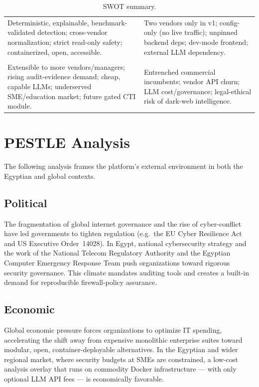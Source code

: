 \begin{table}[ht]
\centering
\caption{SWOT summary.}\label{tab:ch1-swot}
\begin{tabular}{|L{0.46\textwidth}|L{0.46\textwidth}|}
\hline
{} &  \\ \hline
Deterministic, explainable, benchmark-validated detection; cross-vendor normalization; strict read-only safety; containerized, open, accessible. &
Two vendors only in v1; config-only (no live traffic); unpinned backend deps; dev-mode frontend; external LLM dependency. \\ \hline
{} &  \\ \hline
Extensible to more vendors/managers; rising audit-evidence demand; cheap, capable LLMs; underserved SME/education market; future gated CTI module. &
Entrenched commercial incumbents; vendor API churn; LLM cost/governance; legal-ethical risk of dark-web intelligence. \\ \hline
\end{tabular}
\end{table}

\section{PESTLE Analysis}
\label{sec:ch1-pestle}

The following analysis frames the platform's external environment in both the Egyptian and global contexts.

\subsection{Political}
The fragmentation of global internet governance and the rise of cyber-conflict have led governments to tighten regulation (e.g.\ the EU Cyber Resilience Act and US Executive Order~14028). In Egypt, national cybersecurity strategy and the work of the National Telecom Regulatory Authority and the Egyptian Computer Emergency Response Team push organizations toward rigorous security governance. This climate mandates auditing tools and creates a built-in demand for reproducible firewall-policy assurance.

\subsection{Economic}
Global economic pressure forces organizations to optimize IT spending, accelerating the shift away from expensive monolithic enterprise suites toward modular, open, container-deployable alternatives. In the Egyptian and wider regional market, where security budgets at SMEs are constrained, a low-cost analysis overlay that runs on commodity Docker infrastructure --- with only optional LLM API fees --- is economically favorable.

